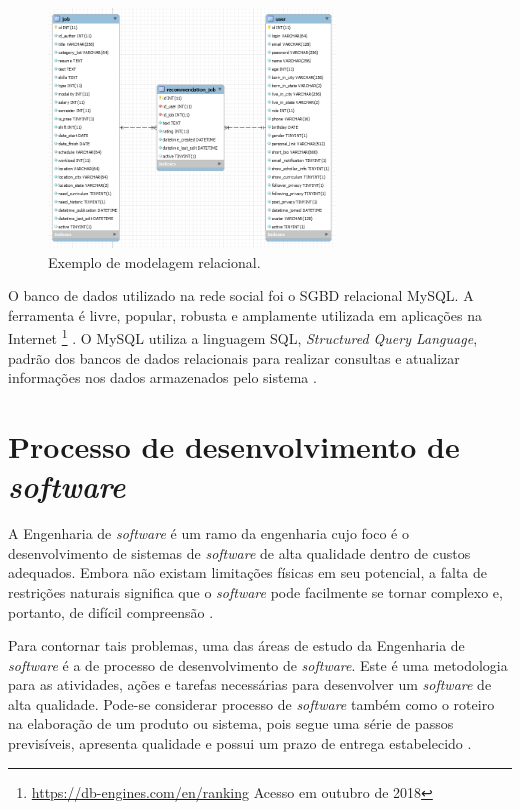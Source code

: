 \begin{figure}[h]
    \caption{Exemplo de modelagem relacional.}
       	\begin{center}
            \includegraphics[width=0.68\textwidth]{figuras/er-exemplo.png}
        \end{center}
    \label{modelagemBDLogicoExemplol}
\end{figure}

O banco de dados utilizado na rede social foi o SGBD relacional MySQL. A ferramenta é livre, popular, robusta e amplamente utilizada em aplicações na Internet \footnote{\url{https://db-engines.com/en/ranking} Acesso em outubro de 2018} \cite{mysql}. O MySQL utiliza a linguagem SQL, \textit{Structured Query Language}, padrão dos bancos de dados relacionais para realizar consultas e atualizar informações nos dados armazenados pelo sistema \cite{sqlCompleteBook}.

\section{Processo de desenvolvimento de \textit{software}}

A Engenharia de \textit{software} é um ramo da engenharia cujo foco é o desenvolvimento de sistemas de \textit{software} de alta qualidade dentro de custos adequados. Embora não existam limitações físicas em seu potencial, a falta de restrições naturais significa que o \textit{software} pode facilmente se tornar complexo e, portanto, de difícil compreensão \cite{sommerville}.

Para contornar tais problemas, uma das áreas de estudo da Engenharia de \textit{software} é a de processo de desenvolvimento de \textit{software}. Este é uma metodologia para as atividades, ações e tarefas necessárias para desenvolver um \textit{software} de alta qualidade. Pode-se considerar processo de \textit{software} também como o roteiro na elaboração de um produto ou sistema, pois segue uma série de passos previsíveis, apresenta qualidade e possui um prazo de entrega estabelecido \cite{pressman}.

